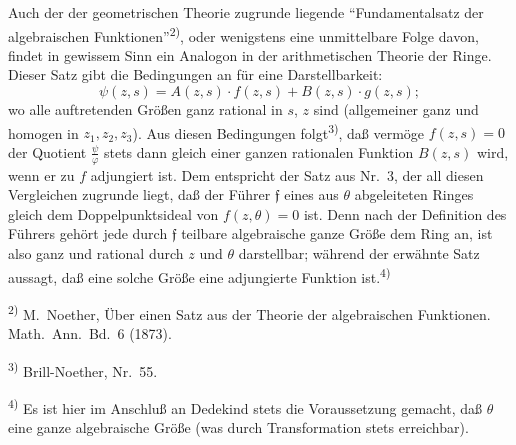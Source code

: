\documentclass[12pt,a4paper]{article}
\begin{document}
Auch der der geometrischen Theorie zugrunde liegende ``Fundamentalsatz der algebraischen Funktionen''\textsuperscript{2)}, oder wenigstens eine unmittelbare Folge davon, findet in gewissem Sinn ein Analogon in der arithmetischen Theorie der Ringe. Dieser Satz gibt die Bedingungen an f\"ur eine Darstellbarkeit:
\[
\psi(z,s)=A(z,s)\cdot f(z,s)+B(z,s)\cdot g(z,s);
\]
wo alle auftretenden Gr\"o\ss{}en ganz rational in $s$, $z$ sind (allgemeiner ganz und homogen in $z_{1},z_{2},z_{3}$). Aus diesen Bedingungen folgt\textsuperscript{3)}, da\ss{} verm\"oge $f(z,s)=0$ der Quotient $\frac{\psi}{\varphi}$ stets dann gleich einer ganzen rationalen Funktion $B(z,s)$ wird, wenn er zu $f$ adjungiert ist. Dem entspricht der Satz aus Nr.\ 3, der all diesen Vergleichen zugrunde liegt, da\ss{} der F\"uhrer $\mathfrak{f}$ eines aus $\theta$ abgeleiteten Ringes gleich dem Doppelpunktsideal von $f(z,\theta)=0$ ist. Denn nach der Definition des F\"uhrers geh\"ort jede durch $\mathfrak{f}$ teilbare algebraische ganze Gr\"o\ss{}e dem Ring an, ist also ganz und rational durch $z$ und $\theta$ darstellbar; w\"ahrend der erw\"ahnte Satz aussagt, da\ss{} eine solche Gr\"o\ss{}e eine adjungierte Funktion ist.\textsuperscript{4)}

\smallskip
\noindent\textsuperscript{2)} M.\ Noether, \"Uber einen Satz aus der Theorie der algebraischen Funktionen. Math.\ Ann.\ Bd.\ 6 (1873).

\smallskip
\noindent\textsuperscript{3)} Brill-Noether, Nr.\ 55.

\smallskip
\noindent\textsuperscript{4)} Es ist hier im Anschlu\ss{} an Dedekind stets die Voraussetzung gemacht, da\ss{} $\theta$ eine ganze algebraische Gr\"o\ss{}e (was durch Transformation stets erreichbar).
\end{document}
